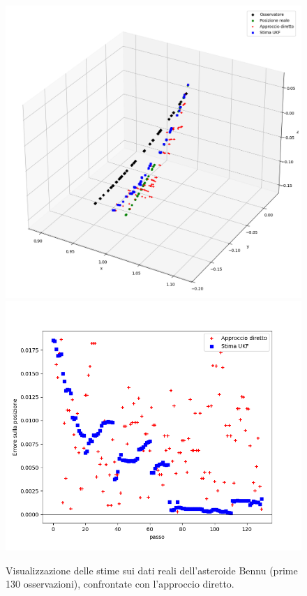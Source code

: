 \documentclass[12pt,a4paper,openright,twoside]{book}
\begin{document}
\begin{figure}
    \includegraphics[width=0.55\linewidth]{figures/Bennu_130_3d.png}
    \includegraphics[width=0.45\linewidth]{figures/Bennu_130_error.png}
    \caption{Visualizzazione delle stime sui dati reali dell'asteroide Bennu (prime 130 osservazioni), confrontate con l'approccio diretto.}
    \label{fig:Bennu130}
    \vspace{2\baselineskip}
\end{figure}
\end{document}
